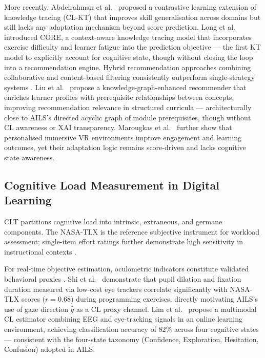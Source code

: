 \documentclass[ASNA,twocolumn]{USG} %
\begin{document}
More recently, Abdelrahman et al.\ \cite{Abdelrahman2023}
proposed a contrastive learning extension of knowledge tracing
(CL-KT) that improves skill generalisation across domains but
still lacks any adaptation mechanism beyond score prediction.
Long et al.\ \cite{Long2022} introduced CORE, a
context-aware knowledge tracing model that incorporates
exercise difficulty and learner fatigue into the prediction
objective --- the first KT model to explicitly account for
cognitive state, though without closing the loop into a
recommendation engine.
Hybrid recommendation approaches combining collaborative and
content-based filtering consistently outperform single-strategy
systems \cite{Khanal2020}.
Liu et al.\ \cite{Liu2023} propose a knowledge-graph-enhanced
recommender that enriches learner profiles with prerequisite
relationships between concepts, improving recommendation
relevance in structured curricula --- architecturally close to
AILS's directed acyclic graph of module prerequisites, though
without CL awareness or XAI transparency.
Marougkas et al.\ \cite{Marougkas2024} further show that
personalised immersive VR environments improve engagement and
learning outcomes, yet their adaptation logic remains
score-driven and lacks cognitive state awareness.

\subsection{Cognitive Load Measurement in Digital Learning}

CLT \cite{Sweller1988} partitions cognitive load into intrinsic,
extraneous, and germane components.
The NASA-TLX \cite{Hart1988} is the reference subjective
instrument for workload assessment; single-item effort ratings
further demonstrate high sensitivity in instructional contexts
\cite{Paas1992}.

For real-time objective estimation, oculometric indicators
constitute validated behavioral proxies
\cite{Suzuki2024,Xue2024}.
Shi et al.\ \cite{Shi2023} demonstrate that pupil dilation and
fixation duration measured via low-cost eye trackers correlate
significantly with NASA-TLX scores ($r{=}0.68$) during
programming exercises, directly motivating AILS's use of gaze
direction $\hat{g}$ as a CL proxy channel.
Lim et al.\ \cite{Lim2023} propose a multimodal CL estimator
combining EEG and eye-tracking signals in an online learning
environment, achieving classification accuracy of $82\%$
across four cognitive states --- consistent with the four-state
taxonomy (Confidence, Exploration, Hesitation, Confusion)
adopted in AILS.
\end{document}
